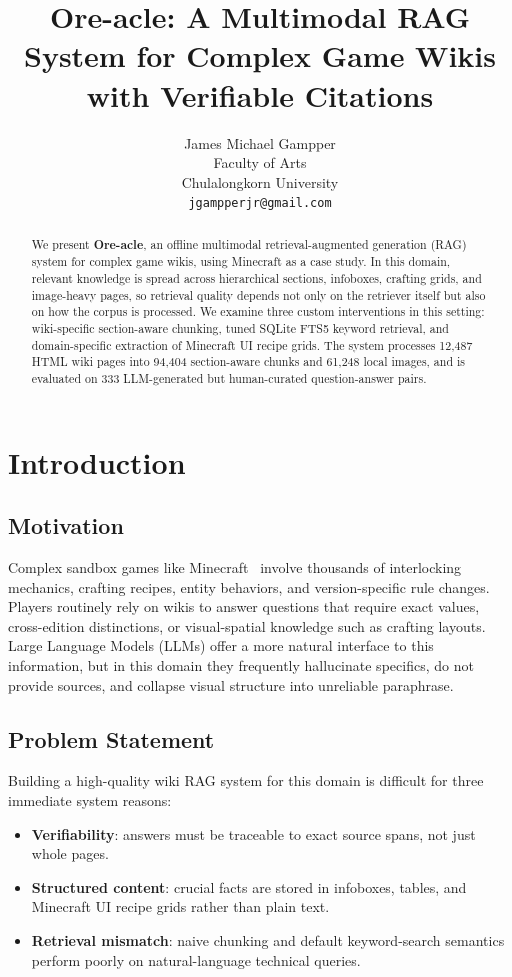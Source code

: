 \documentclass[11pt,a4paper]{article}
\title{Ore-acle: A Multimodal RAG System for Complex Game Wikis with Verifiable Citations}
\author{James Michael Gampper \\
  Faculty of Arts \\
  Chulalongkorn University \\
  \texttt{jgampperjr@gmail.com}}
\date{}
\begin{document}
\maketitle

\begin{abstract}
We present \textbf{Ore-acle}, an offline multimodal retrieval-augmented generation (RAG) system for complex game wikis, using Minecraft as a case study. In this domain, relevant knowledge is spread across hierarchical sections, infoboxes, crafting grids, and image-heavy pages, so retrieval quality depends not only on the retriever itself but also on how the corpus is processed. We examine three custom interventions in this setting: wiki-specific section-aware chunking, tuned SQLite FTS5 keyword retrieval, and domain-specific extraction of Minecraft UI recipe grids. The system processes 12,487 HTML wiki pages into 94,404 section-aware chunks and 61,248 local images, and is evaluated on 333 LLM-generated but human-curated question-answer pairs.
\end{abstract}

\section{Introduction}

\subsection{Motivation}
Complex sandbox games like Minecraft~\cite{minecraft2011} involve thousands of interlocking mechanics, crafting recipes, entity behaviors, and version-specific rule changes. Players routinely rely on wikis to answer questions that require exact values, cross-edition distinctions, or visual-spatial knowledge such as crafting layouts. Large Language Models (LLMs) offer a more natural interface to this information, but in this domain they frequently hallucinate specifics, do not provide sources, and collapse visual structure into unreliable paraphrase.

\subsection{Problem Statement}
Building a high-quality wiki RAG system for this domain is difficult for three immediate system reasons:
\begin{itemize}
    \item \textbf{Verifiability}: answers must be traceable to exact source spans, not just whole pages.
    \item \textbf{Structured content}: crucial facts are stored in infoboxes, tables, and Minecraft UI recipe grids rather than plain text.
    \item \textbf{Retrieval mismatch}: naive chunking and default keyword-search semantics perform poorly on natural-language technical queries.
\end{itemize}
\end{document}
